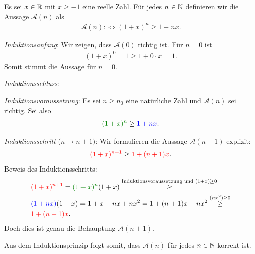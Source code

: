 \clearpage
\begin{myanswer}[myexercise:0206]
	Es sei $x\in\mathbb{R}$ mit $x\geq -1$ eine reelle Zahl. Für jedes $n\in\mathbb{N}$ definieren wir die Aussage $\mathcal{A}(n)$ als
	\begin{align*}
		\mathcal{A}(n) :\iff (1+x)^n\geq 1+nx.
	\end{align*}
	\begin{aenum}
		\item \textit{Induktionsanfang}: Wir zeigen, dass $\mathcal{A}(0)$ richtig ist. Für $n=0$ ist
		\begin{align*}
			(1+x)^0 = 1 \geq 1 + 0\cdot x = 1.
		\end{align*}
		Somit stimmt die Aussage für $n=0$.
		\item \textit{Induktionsschluss}:
		\begin{renum}
			\item \textit{Induktionsvoraussetzung}: Es sei $n\geq n_0$ eine natürliche Zahl und $\mathcal{A}(n)$ sei richtig. Sei also
			\begin{align*}
				\textcolor{Green}{(1+x)^n} \geq \textcolor{Blue}{1+nx}.
			\end{align*}
			\item \textit{Induktionsschritt} ($n\to n+1)$: Wir formulieren die Aussage $\mathcal{A}(n+1)$ explizit:
				\begin{align*}
					\textcolor{Red}{(1+x)^{n+1}} \geq \textcolor{Red}{1 + (n+1)x}.
				\end{align*}
				Beweis des Induktionsschritts:
				\begin{align*}
					 & \textcolor{Red}{(1+x)^{n+1}} = \textcolor{Green}{(1+x)^n} (1+x) \stackrel{\text{Induktionsvoraussetzung und }(1+x)\geq 0}{\geq} \\
					 & \textcolor{Blue}{(1+nx)}(1+x) = 1+x+nx+nx^2 = 1+(n+1)x + nx^2 \stackrel{(nx^2)\geq 0}{\geq}                                     \\
					 & \textcolor{Red}{1 + (n+1)x}.
				\end{align*}
				Doch dies ist genau die Behauptung $\mathcal{A}(n+1)$.
		\end{renum}
	\end{aenum}
	Aus dem Induktionsprinzip folgt somit, dass $\mathcal{A}(n)$ für jedes $n\in\mathbb{N}$ korrekt ist.
\end{myanswer}

